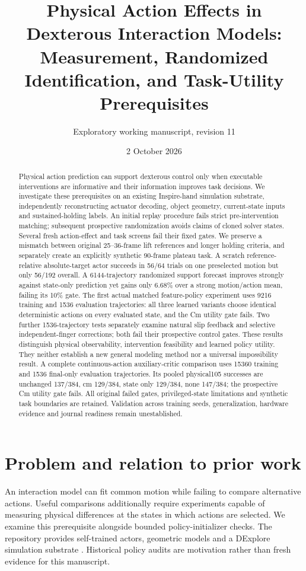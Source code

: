 \documentclass[10pt]{article}
\title{Physical Action Effects in Dexterous Interaction Models:\\Measurement, Randomized Identification, and Task-Utility Prerequisites}
\author{Exploratory working manuscript, revision 11}
\date{2 October 2026}
\begin{document}
\maketitle
\begin{abstract}
Physical action prediction can support dexterous control only when executable
interventions are informative and their information improves task decisions.
We investigate these prerequisites on an existing Inspire-hand simulation
substrate, independently reconstructing actuator decoding, object geometry,
current-state inputs and sustained-holding labels. An initial replay procedure
fails strict pre-intervention matching; subsequent prospective randomization
avoids claims of cloned solver states. Several fresh action-effect and task
screens fail their fixed gates. We preserve a mismatch between original
25--36-frame lift references and longer holding criteria, and separately create
an explicitly synthetic 90-frame plateau task. A scratch reference-relative
absolute-target actor succeeds in 56/64 trials on one preselected motion but only
56/192 overall. A 6144-trajectory randomized support forecast improves strongly
against state-only prediction yet gains only 6.68\% over a strong motion/action
mean, failing its 10\% gate. The first actual matched feature-policy experiment
uses 9216 training and 1536 evaluation trajectories: all three learned variants
choose identical deterministic actions on every evaluated state, and the Cm
utility gate fails. Two further 1536-trajectory tests separately examine natural
slip feedback and selective independent-finger corrections; both fail their
prospective control gates. These results distinguish physical observability,
intervention feasibility and learned policy utility. They neither establish a
new general modeling method nor a universal impossibility result. A complete continuous-action auxiliary-critic comparison uses 15360 training and 1536 final-only evaluation trajectories. Its pooled physical105 successes are unchanged 137/384, cm 129/384, state only 129/384, none 147/384; the prospective Cm utility gate fails. 
All original failed gates, privileged-state limitations and synthetic task
boundaries are retained. Validation across training seeds, generalization,
hardware evidence and journal readiness remain unestablished.
\end{abstract}

\section{Problem and relation to prior work}
An interaction model can fit common motion while failing to compare alternative actions.
Useful comparisons additionally require experiments capable of measuring physical
differences at the states in which actions are selected. We examine this prerequisite
alongside bounded policy-initializer checks. The repository provides self-trained
actors, geometric models and a DExplore simulation substrate \cite{xu2025}. Historical
policy audits are motivation rather than fresh evidence for this manuscript.
\end{document}

